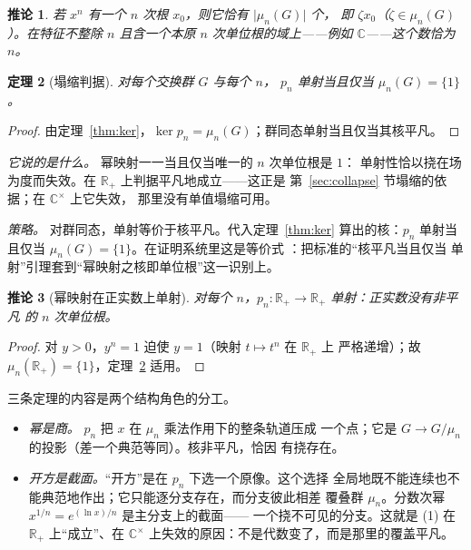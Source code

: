 \documentclass[submission,noinfoline]{jsfds}
\newtheorem{theorem}{定理}
\newtheorem{corollary}[theorem]{推论}
\newcommand{\Lean}[1]{}
\newcommand{\abs}[1]{\lvert #1\rvert}
\begin{document}
\begin{corollary}\label{cor:branches}
若 $x^n$ 有一个 $n$ 次根 $x_0$，则它恰有 $\abs{\mu_n(G)}$ 个，
即 $\zeta x_0$（$\zeta\in\mu_n(G)$）。在特征不整除 $n$ 且含一个本原
$n$ 次单位根的域上——例如 $\mathbb C$——这个数恰为 $n$。
\end{corollary}

\begin{theorem}[塌缩判据]\label{thm:collapse}
对每个交换群 $G$ 与每个 $n$，
$p_n$ 单射当且仅当 $\mu_n(G)=\{1\}$。
\end{theorem}
\begin{proof}
由定理~\ref{thm:ker}，$\ker p_n=\mu_n(G)$；群同态单射当且仅当其核平凡。
\Lean{powMap\_injective\_iff\_nRoots\_trivial}
\end{proof}

\textit{它说的是什么。} 幂映射一一当且仅当唯一的 $n$ 次单位根是 $1$：
单射性恰以挠在场为度而失效。在 $\mathbb R_+$ 上判据平凡地成立——这正是
第~\ref{sec:collapse} 节塌缩的依据；在 $\mathbb C^\times$ 上它失效，
那里没有单值塌缩可用。

\textit{策略。} 对群同态，单射等价于核平凡。代入定理~\ref{thm:ker}
算出的核：$p_n$ 单射当且仅当 $\mu_n(G)=\{1\}$。在证明系统里这是等价式
\Lean{powMap\_injective\_iff\_nRoots\_trivial}：把标准的``核平凡当且仅当
单射''引理套到``幂映射之核即单位根''这一识别上。

\begin{corollary}[幂映射在正实数上单射]\label{cor:p-inj-Rpos}
对每个 $n$，$p_n\colon\mathbb R_+\to\mathbb R_+$ 单射：正实数没有非平凡
的 $n$ 次单位根。
\end{corollary}
\begin{proof}
对 $y>0$，$y^n=1$ 迫使 $y=1$（映射 $t\mapsto t^n$ 在 $\mathbb R_+$ 上
严格递增）；故 $\mu_n(\mathbb R_+)=\{1\}$，定理~\ref{thm:collapse}
适用。 \Lean{pow\_inj\_on\_Rpos}
\end{proof}

三条定理的内容是两个结构角色的分工。

\begin{itemize}
\item \emph{幂是商。} $p_n$ 把 $x$ 在 $\mu_n$ 乘法作用下的整条轨道压成
一个点；它是 $G\to G/\mu_n$ 的投影（差一个典范等同）。核非平凡，恰因
有挠存在。
\item \emph{开方是截面。}``开方''是在 $p_n$ 下选一个原像。这个选择
全局地既不能连续也不能典范地作出；它只能逐分支存在，而分支彼此相差
覆叠群 $\mu_n$。分数次幂 $x^{1/n}=e^{(\ln x)/n}$ 是主分支上的截面——
一个挠不可见的分支。这就是 (1) 在 $\mathbb R_+$ 上``成立''、在
$\mathbb C^\times$ 上失效的原因：不是代数变了，而是那里的覆盖平凡。
\end{itemize}
\end{document}
